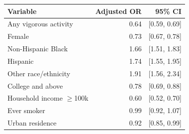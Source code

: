 \begin{tabular}{lrr}
\toprule
Variable & Adjusted OR & 95\% CI \\
\midrule
Any vigorous activity & 0.64 & [0.59, 0.69] \\
Female & 0.73 & [0.67, 0.78] \\
Non-Hispanic Black & 1.66 & [1.51, 1.83] \\
Hispanic & 1.74 & [1.55, 1.95] \\
Other race/ethnicity & 1.91 & [1.56, 2.34] \\
College and above & 0.78 & [0.69, 0.88] \\
Household income $\ge$100k & 0.60 & [0.52, 0.70] \\
Ever smoker & 0.99 & [0.92, 1.07] \\
Urban residence & 0.92 & [0.85, 0.99] \\
\bottomrule
\end{tabular}